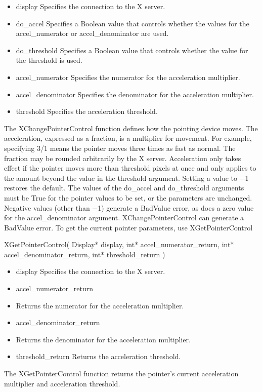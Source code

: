 \documentclass{report}
\begin{document}
\begin{itemize}
\begin{itemize}
            \begin{itemize}
                \item display Specifies the connection to the X server.
                \item do\_accel Specifies a Boolean value that controls whether the values for the accel\_numerator or accel\_denominator are used.
                \item do\_threshold Specifies a Boolean value that controls whether the value for the threshold is used.
                \item accel\_numerator Specifies the numerator for the acceleration multiplier.
                \item accel\_denominator Specifies the denominator for the acceleration multiplier.
                \item threshold Specifies the acceleration threshold.
            \end{itemize}
            The XChangePointerControl function defines how the pointing device moves. The acceleration, expressed as a fraction, is a multiplier for movement. For example, specifying 3/1 means the pointer moves three times as fast as normal. The fraction may be rounded arbitrarily by the X server. Acceleration only takes effect if the pointer moves more than threshold pixels at once and only applies to the amount beyond the value in the threshold argument. Setting a value to −1 restores the default. The values of the do\_accel and do\_threshold arguments must be True for the pointer values to be set, or the parameters are unchanged. Negative values (other than −1) generate a BadValue error, as does a zero value for the accel\_denominator argument.
            \bigbreak \noindent 
            XChangePointerControl can generate a BadValue error.
            \bigbreak \noindent 
            To get the current pointer parameters, use XGetPointerControl
            \bigbreak \noindent 
            \begin{cppcode}
            XGetPointerControl(
                Display* display,
                int* accel_numerator_return,
                int* accel_denominator_return,
                int* threshold_return
            )
            \end{cppcode}
            \begin{itemize}
                \item display Specifies the connection to the X server.
                \item accel\_numerator\_return
                \item Returns the numerator for the acceleration multiplier.
                \item accel\_denominator\_return
                \item Returns the denominator for the acceleration multiplier.
                \item threshold\_return Returns the acceleration threshold.
            \end{itemize}
            \bigbreak \noindent 
            The XGetPointerControl function returns the pointer’s current acceleration multiplier and acceleration threshold.



\end{itemize}
\end{itemize}
\end{document}

